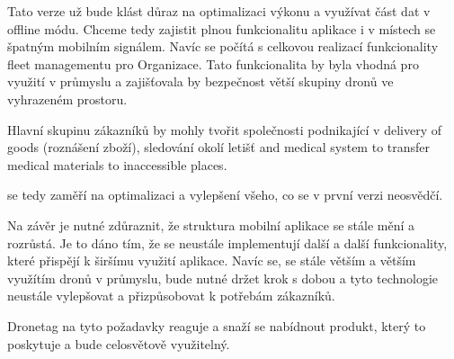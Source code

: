 Tato verze už bude klást důraz na optimalizaci výkonu a využívat část dat v offline módu.
Chceme tedy zajistit plnou funkcionalitu aplikace i v místech se špatným mobilním signálem.
Navíc se počítá s celkovou realizací funkcionality fleet managementu pro Organizace.
Tato funkcionalita by byla vhodná pro využití v průmyslu a zajišťovala by bezpečnost větší skupiny dronů ve vyhrazeném prostoru.

Hlavní skupinu zákazníků by mohly tvořit společnosti podnikající v delivery of goods (roznášení zboží), sledování okolí letišť and medical system to transfer medical materials to inaccessible places.

se tedy zaměří na optimalizaci a vylepšení všeho, co se v první verzi neosvědčí.

Na závěr je nutné zdůraznit, že struktura mobilní aplikace se stále mění a rozrůstá.
Je to dáno tím, že se neustále implementují další a další funkcionality, které přispějí k širšímu využití aplikace.
Navíc se, se stále větším a větším využítím dronů v průmyslu, bude nutné držet krok s dobou a tyto technologie neustále vylepšovat a přizpůsobovat k potřebám zákazníků.

Dronetag na tyto požadavky reaguje a snaží se nabídnout produkt, který to poskytuje a bude celosvětově využitelný.